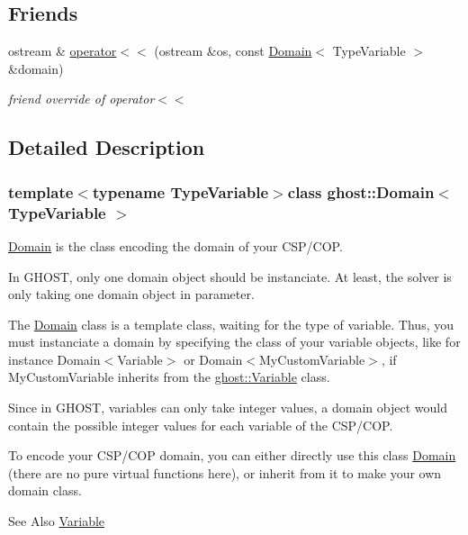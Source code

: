\subsection*{Friends}
\begin{DoxyCompactItemize}
\item 
ostream \& \hyperlink{classghost_1_1Domain_a73846a35a1024305520654677c9beb02}{operator$<$$<$} (ostream \&os, const \hyperlink{classghost_1_1Domain}{Domain}$<$ Type\-Variable $>$ \&domain)
\begin{DoxyCompactList}\small\item\em friend override of operator$<$$<$ \end{DoxyCompactList}\end{DoxyCompactItemize}


\subsection{Detailed Description}
\subsubsection*{template$<$typename Type\-Variable$>$class ghost\-::\-Domain$<$ Type\-Variable $>$}

\hyperlink{classghost_1_1Domain}{Domain} is the class encoding the domain of your C\-S\-P/\-C\-O\-P. 

In G\-H\-O\-S\-T, only one domain object should be instanciate. At least, the solver is only taking one domain object in parameter.

The \hyperlink{classghost_1_1Domain}{Domain} class is a template class, waiting for the type of variable. Thus, you must instanciate a domain by specifying the class of your variable objects, like for instance Domain$<$\-Variable$>$ or Domain$<$\-My\-Custom\-Variable$>$, if My\-Custom\-Variable inherits from the \hyperlink{classghost_1_1Variable}{ghost\-::\-Variable} class.

Since in G\-H\-O\-S\-T, variables can only take integer values, a domain object would contain the possible integer values for each variable of the C\-S\-P/\-C\-O\-P.

To encode your C\-S\-P/\-C\-O\-P domain, you can either directly use this class \hyperlink{classghost_1_1Domain}{Domain} (there are no pure virtual functions here), or inherit from it to make your own domain class.

\begin{DoxySeeAlso}{See Also}
\hyperlink{classghost_1_1Variable}{Variable} 
\end{DoxySeeAlso}


